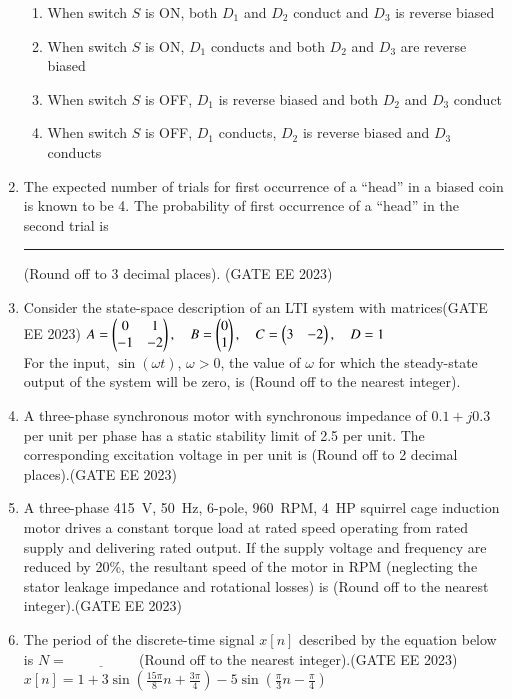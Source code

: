 \documentclass[a4paper,12pt]{exam}
\theoremstyle{remark}
\begin{document}
\begin{enumerate}
\begin{enumerate}
    \item When switch $S$ is ON, both $D_1$ and $D_2$ conduct and $D_3$ is reverse biased
    \item When switch $S$ is ON, $D_1$ conducts and both $D_2$ and $D_3$ are reverse biased
    \item When switch $S$ is OFF, $D_1$ is reverse biased and both $D_2$ and $D_3$ conduct
    \item When switch $S$ is OFF, $D_1$ conducts, $D_2$ is reverse biased and $D_3$ conducts
\end{enumerate}
\item The expected number of trials for first occurrence of a “head” in a biased coin is 
known to be 4. The probability of first occurrence of a “head” in the second trial is \rule{2cm}{0.15mm}
 (Round off to 3 decimal places). \hfill{(GATE EE 2023)}

 \item Consider the state-space description of an LTI system with matrices\hfill{(GATE EE 2023)}
$
A = \begin{pmatrix} 0 & 1 \\ -1 & -2 \end{pmatrix}, \quad
B = \begin{pmatrix} 0 \\ 1 \end{pmatrix}, \quad
C = \begin{pmatrix} 3 & -2 \end{pmatrix}, \quad
D = 1
$\\
For the input, $\sin(\omega t)$, $\omega > 0$, the value of $\omega$ for which the steady-state output of the system will be zero, is \underline{\hspace{2cm}} (Round off to the nearest integer).

\item A three-phase synchronous motor with synchronous impedance of $0.1 + j0.3$ per unit per phase has a static stability limit of 2.5 per unit. The corresponding excitation voltage in per unit is \underline{\hspace{2cm}} (Round off to 2 decimal places).\hfill{(GATE EE 2023)}

\item A three-phase 415~V, 50~Hz, 6-pole, 960~RPM, 4~HP squirrel cage induction motor drives a constant torque load at rated speed operating from rated supply and delivering rated output. If the supply voltage and frequency are reduced by 20\%, the resultant speed of the motor in RPM (neglecting the stator leakage impedance and rotational losses) is \underline{\hspace{2cm}} (Round off to the nearest integer).\hfill{(GATE EE 2023)}
\newpage

\item The period of the discrete-time signal $x[n]$ described by the equation below is $N = \underline{\hspace{2cm}}$ (Round off to the nearest integer).\hfill{(GATE EE 2023)}
$
x[n] = 1 + 3 \sin \left( \frac{15\pi}{8} n + \frac{3\pi}{4} \right) - 5 \sin \left( \frac{\pi}{3} n - \frac{\pi}{4} \right)
$


\end{enumerate}
\end{document}
